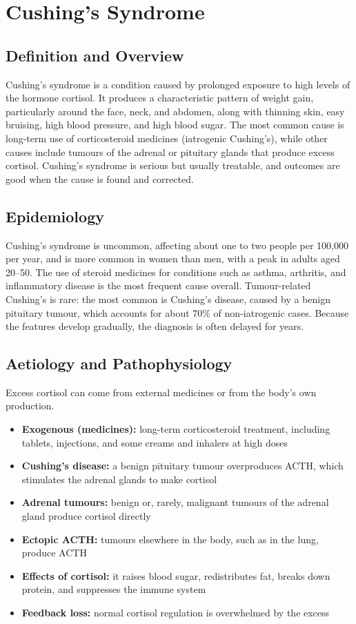 \chapter{Cushing's Syndrome}

\section*{Definition and Overview}
Cushing's syndrome is a condition caused by prolonged exposure to high levels of the hormone cortisol. It produces a characteristic pattern of weight gain, particularly around the face, neck, and abdomen, along with thinning skin, easy bruising, high blood pressure, and high blood sugar. The most common cause is long-term use of corticosteroid medicines (iatrogenic Cushing's), while other causes include tumours of the adrenal or pituitary glands that produce excess cortisol. Cushing's syndrome is serious but usually treatable, and outcomes are good when the cause is found and corrected.

\section*{Epidemiology}
Cushing's syndrome is uncommon, affecting about one to two people per 100,000 per year, and is more common in women than men, with a peak in adults aged 20--50. The use of steroid medicines for conditions such as asthma, arthritis, and inflammatory disease is the most frequent cause overall. Tumour-related Cushing's is rare: the most common is Cushing's disease, caused by a benign pituitary tumour, which accounts for about 70\% of non-iatrogenic cases. Because the features develop gradually, the diagnosis is often delayed for years.

\section*{Aetiology and Pathophysiology}
Excess cortisol can come from external medicines or from the body's own production.

\begin{itemize}
    \item \textbf{Exogenous (medicines):} long-term corticosteroid treatment, including tablets, injections, and some creams and inhalers at high doses
    \item \textbf{Cushing's disease:} a benign pituitary tumour overproduces ACTH, which stimulates the adrenal glands to make cortisol
    \item \textbf{Adrenal tumours:} benign or, rarely, malignant tumours of the adrenal gland produce cortisol directly
    \item \textbf{Ectopic ACTH:} tumours elsewhere in the body, such as in the lung, produce ACTH
    \item \textbf{Effects of cortisol:} it raises blood sugar, redistributes fat, breaks down protein, and suppresses the immune system
    \item \textbf{Feedback loss:} normal cortisol regulation is overwhelmed by the excess
\end{itemize}

